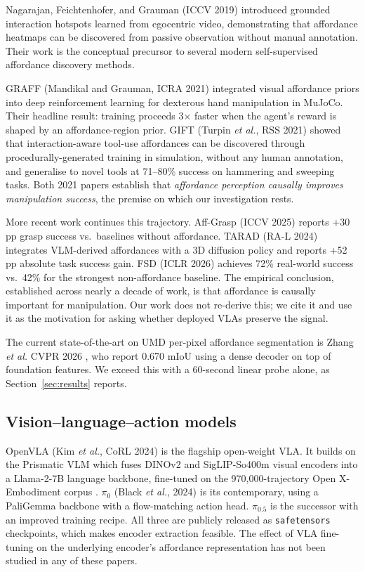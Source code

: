 \documentclass[11pt]{article}
\begin{document}
Nagarajan, Feichtenhofer, and Grauman (ICCV 2019)
\cite{nagarajan2019grounded} introduced grounded interaction hotspots
learned from egocentric video, demonstrating that affordance heatmaps
can be discovered from passive observation without manual annotation.
Their work is the conceptual precursor to several modern self-supervised
affordance discovery methods.

GRAFF (Mandikal and Grauman, ICRA 2021) \cite{mandi2021graff} integrated
visual affordance priors into deep reinforcement learning for dexterous
hand manipulation in MuJoCo. Their headline result: training proceeds
3$\times$ faster when the agent's reward is shaped by an
affordance-region prior. GIFT (Turpin \emph{et al.}, RSS 2021)
\cite{turpin2021gift} showed that interaction-aware tool-use affordances
can be discovered through procedurally-generated training in simulation,
without any human annotation, and generalise to novel tools at 71--80\%
success on hammering and sweeping tasks. Both 2021 papers establish that
\emph{affordance perception causally improves manipulation success}, the
premise on which our investigation rests.

More recent work continues this trajectory. Aff-Grasp (ICCV 2025)
\cite{li2025affgrasp} reports +30 pp grasp success vs.~baselines without
affordance. TARAD (RA-L 2024) \cite{tarad2024} integrates VLM-derived
affordances with a 3D diffusion policy and reports +52 pp absolute task
success gain. FSD (ICLR 2026) \cite{fsd2026} achieves 72\% real-world
success vs.~42\% for the strongest non-affordance baseline. The
empirical conclusion, established across nearly a decade of work, is
that affordance is causally important for manipulation. Our work does
not re-derive this; we cite it and use it as the motivation for asking
whether deployed VLAs preserve the signal.

The current state-of-the-art on UMD per-pixel affordance segmentation is
Zhang \emph{et al.} CVPR 2026 \cite{zhang2026umd}, who report 0.670 mIoU
using a dense decoder on top of foundation features. We exceed this with
a 60-second linear probe alone, as Section~\ref{sec:results} reports.

\subsection{Vision--language--action models}

OpenVLA (Kim \emph{et al.}, CoRL 2024) \cite{kim2024openvla} is the
flagship open-weight VLA. It builds on the Prismatic VLM
\cite{karamcheti2024prismatic} which fuses DINOv2 and SigLIP-So400m
visual encoders into a Llama-2-7B language backbone, fine-tuned on the
970,000-trajectory Open X-Embodiment corpus \cite{padalkar2024oxe}.
$\pi_0$ (Black \emph{et al.}, 2024) \cite{black2024pi0} is its
contemporary, using a PaliGemma backbone with a flow-matching action
head. $\pi_{0.5}$ \cite{intelligence2024pi05} is the successor with an
improved training recipe. All three are publicly released as
\verb|safetensors| checkpoints, which makes encoder extraction feasible.
The effect of VLA fine-tuning on the underlying encoder's affordance
representation has not been studied in any of these papers.
\end{document}
